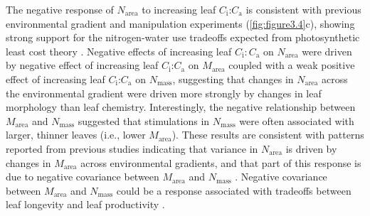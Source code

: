 \noindent The negative response of $N_\mathrm{area}$ to increasing leaf $C_\mathrm{i}$:$C_\mathrm{a}$ is consistent with previous environmental gradient  and manipulation experiments (\ref{fig:figure3.4}c), showing strong support for the nitrogen-water use tradeoffs expected from photosynthetic least cost theory . Negative effects of increasing leaf $C_\mathrm{i}\mathrm{:}C_\mathrm{a}$ on $N_\mathrm{area}$ were driven by  negative effect of increasing leaf $C_\mathrm{i}$:$C_\mathrm{a}$ on $M_\mathrm{area}$ coupled with a weak positive effect of increasing leaf $C_\mathrm{i}$:$C_\mathrm{a}$ on $N_\mathrm{mass}$, suggesting that changes in $N_\mathrm{area}$ across the environmental gradient were driven more strongly by changes in leaf morphology than leaf chemistry. Interestingly, the negative relationship between $M_\mathrm{area}$ and $N_\mathrm{mass}$ suggested that stimulations in $N_\mathrm{mass}$ were often associated with larger, thinner leaves (i.e., lower $M_\mathrm{area}$). These results are consistent with patterns reported from previous studies indicating that variance in $N_\mathrm{area}$ is driven by changes in $M_\mathrm{area}$ across environmental gradients, and that part of this response is due to negative covariance between $M_\mathrm{area}$ and $N_\mathrm{mass}$ . Negative covariance between $M_\mathrm{area}$ and $N_\mathrm{mass}$ could be a response associated with tradeoffs between leaf longevity and leaf productivity .

